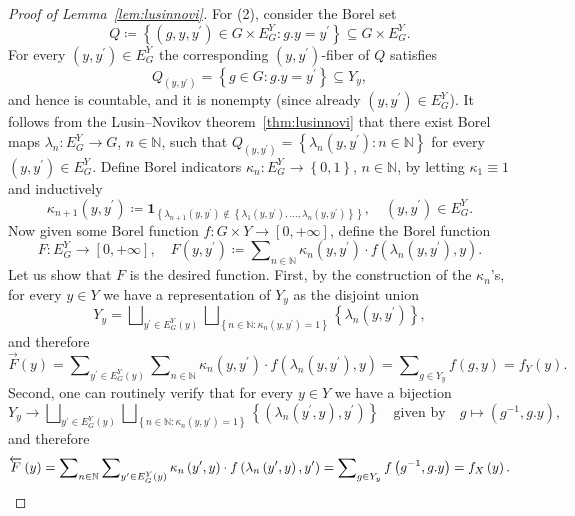 \documentclass{amsart}
\numberwithin{equation}{subsection}
\theoremstyle{remark}
\begin{document}
\begin{proof}[Proof of Lemma~\ref{lem:lusinnovi}]
For (2), consider the Borel set
\[Q\coloneqq\left\{ \left(g,y,y^{\prime}\right)\in G\times E_{G}^{Y}:g.y=y^{\prime}\right\} \subseteq G\times E_{G}^{Y}.\]
For every \(\left(y,y^{\prime}\right)\in E_{G}^{Y}\) the corresponding \(\left(y,y^{\prime}\right)\)-fiber of \(Q\) satisfies
\[Q_{\left(y,y^{\prime}\right)}=\left\{ g\in G:g.y=y^{\prime}\right\} \subseteq Y_{y},\]
and hence is countable, and it is nonempty (since already \(\left(y,y^{\prime}\right)\in E_{G}^{Y}\)). It follows from the Lusin--Novikov theorem~\ref{thm:lusinnovi} that there exist Borel maps \(\lambda_{n}:E_{G}^{Y}\to G\), \(n\in\mathbb{N}\), such that \(Q_{\left(y,y^{\prime}\right)}=\left\{ \lambda_{n}\left(y,y^{\prime}\right):n\in\mathbb{N}\right\}\) for every \(\left(y,y^{\prime}\right)\in E_{G}^{Y}\). Define Borel indicators \(\kappa_{n}:E_{G}^{Y}\to\left\{ 0,1\right\}\), \(n\in\mathbb{N}\), by letting \(\kappa_{1}\equiv 1\) and inductively
\[\kappa_{n+1}\left(y,y^{\prime}\right)\coloneqq\mathbf{1}_{\left\{ \lambda_{n+1}\left(y,y^{\prime}\right)\notin\left\{ \lambda_{1}\left(y,y^{\prime}\right),\dotsc,\lambda_{n}\left(y,y^{\prime}\right)\right\} \right\} },\quad\left(y,y^{\prime}\right)\in E_{G}^{Y}.\]
Now given some Borel function \(f:G\times Y\to\left[0,+\infty\right]\), define the Borel function
\[F:E_{G}^{Y}\longrightarrow\left[0,+\infty\right],\quad F\left(y,y^{\prime}\right)\coloneqq\sum\nolimits_{n\in\mathbb{N}}\kappa_{n}\left(y,y^{\prime}\right)\cdot f\left(\lambda_{n}\left(y,y^{\prime}\right),y\right).\]
Let us show that \(F\) is the desired function. First, by the construction of the \(\kappa_{n}\)'s, for every \(y\in Y\) we have a representation of \(Y_{y}\) as the disjoint union
\[Y_{y}=\bigsqcup\nolimits_{y^{\prime}\in E_{G}^{Y}\left(y\right)}\bigsqcup\nolimits_{\left\{ n\in\mathbb{N}:\kappa_{n}\left(y,y^{\prime}\right)=1\right\} }\left\{ \lambda_{n}\left(y,y^{\prime}\right)\right\},\]
and therefore
\[\overrightarrow{F}\left(y\right)=\sum\nolimits_{y^{\prime}\in E_{G}^{Y}\left(y\right)}\sum\nolimits_{n\in\mathbb{N}}\kappa_{n}\left(y,y^{\prime}\right)\cdot f\left(\lambda_{n}\left(y,y^{\prime}\right),y\right)=\sum\nolimits_{g\in Y_{y}}f\left(g,y\right)=f_{Y}\left(y\right).\]
Second, one can routinely verify that for every \(y\in Y\) we have a bijection
\[Y_{y}\to\bigsqcup\nolimits_{y^{\prime}\in E_{G}^{Y}\left(y\right)}\bigsqcup\nolimits_{\left\{ n\in\mathbb{N}:\kappa_{n}\left(y,y^{\prime}\right)=1\right\} }\left\{ \left(\lambda_{n}\left(y^{\prime},y\right),y^{\prime}\right)\right\}\quad\text{given by}\quad g\mapsto\left(g^{-1},g.y\right),\]
and therefore
\[\overleftarrow{F}\left(y\right)=\sum\nolimits_{n\in\mathbb{N}}\sum\nolimits_{y^{\prime}\in E_{G}^{Y}\left(y\right)}\kappa_{n}\left(y^{\prime},y\right)\cdot f\left(\lambda_{n}\left(y^{\prime},y\right),y^{\prime}\right)=\sum\nolimits_{g\in Y_{y}}f\left(g^{-1},g.y\right)=f_{X}\left(y\right).\qedhere\]
\end{proof}
\end{document}
